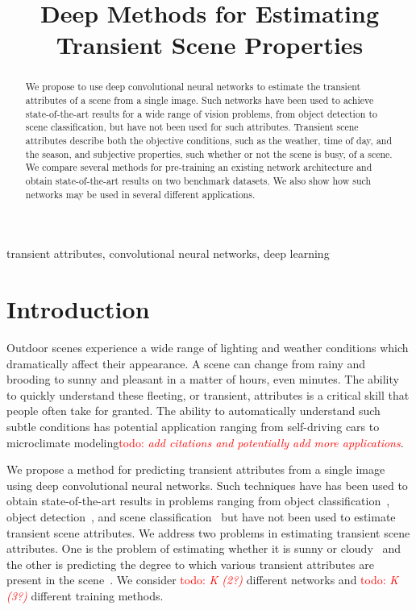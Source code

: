 \documentclass{article}
\title{Deep Methods for Estimating Transient Scene Properties}
\newcommand{\todo}[1]{\textcolor{red}{todo: {\em #1}}}
\begin{document}
\maketitle

\begin{abstract}

We propose to use deep convolutional neural networks to estimate the
transient attributes of a scene from a single image. Such networks
have been used to achieve state-of-the-art results for a wide range of
vision problems, from object detection to scene classification, but
have not been used for such attributes. Transient scene attributes
describe both the objective conditions, such as the weather, time of
day, and the season, and subjective properties, such whether or not
the scene is busy, of a scene. We compare several methods for
pre-training an existing network architecture and obtain
state-of-the-art results on two benchmark datasets.  We also show how
such networks may be used in several different applications.

\end{abstract}

\begin{keywords}
transient attributes, convolutional neural networks, deep learning
\end{keywords}

\section{Introduction}


Outdoor scenes experience a wide range of lighting and weather
conditions which dramatically affect their appearance. A scene can
change from rainy and brooding to sunny and pleasant in a matter of
hours, even minutes. The ability to quickly understand these fleeting,
or transient, attributes is a critical skill that people often take
for granted. The ability to automatically understand such subtle
conditions has potential application ranging from self-driving cars to
microclimate modeling\todo{add citations and potentially add more
applications}.


We propose a method for predicting transient attributes from a single
image using deep convolutional neural networks. Such techniques have
has been used to obtain state-of-the-art results in problems ranging
from object classification~\cite{krizhevsky2012imagenet}, object
detection~\cite{girshick2013rich}, and scene
classification~\cite{zhou2014places} but have not been used to
estimate transient scene attributes. We address two problems in
estimating transient scene attributes. One is the problem of
estimating whether it is sunny or cloudy~\cite{lutwoclass} and the
other is predicting the degree to which various transient attributes
are present in the scene~\cite{Laffont14}. We consider \todo{K (2?)}
different networks and \todo{K (3?)} different training methods.
\end{document}
